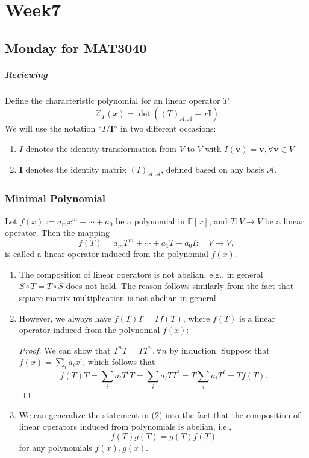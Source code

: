 \chapter{Week7}
\section{Monday for MAT3040}
\paragraph{Reviewing}
Define the characteristic polynomial for an linear operator $T$:
\[
\mathcal{X}_T(x)= \det((T)_{\mathcal{A},\mathcal{A}} - x\bm I)
\]
We will use the notation ``$I/\bm I$'' in two different occasions:
\begin{enumerate}
\item
$I$ denotes the identity transformation from $V$ to $V$ with $I(\bm v)=\bm v,\forall\bm v\in V$
\item
$\bm I$ denotes the identity matrix $(I)_{\mathcal{A},\mathcal{A}}$, defined based on any basis $\mathcal{A}$.
\end{enumerate}

\subsection{Minimal Polynomial}
\begin{definition}
Let $f(x):=a_mx^m+\cdots+a_0$ be a polynomial in $\mathbb{F}[x]$, and $T:V\to V$ be a linear operator.
Then the mapping
\[
f(T)=a_mT^m+\cdots+a_1T+a_0I:\quad
V\to V,
\]
is called a linear operator induced from the polynomial $f(x)$.
\end{definition}
\begin{remark}
\begin{enumerate}
\item
The composition of linear operators is not abelian, e.g., in general $S\circ T=T\circ S$ does not hold.
The reason follows similarly from the fact that square-matrix multiplication is not abelian in general.
\item
However, we always have $f(T)T=Tf(T)$, where $f(T)$ is a linear operator induced from the polynomial $f(x)$:
\begin{proof}
We can show that $T^nT=TT^n,\forall n$ by induction.
Suppose that $f(x)=\sum_ia_ix^i$, which follows that
\[
f(T)T=\sum_ia_iT^iT=\sum_ia_iTT^i=T\sum_ia_iT^i=Tf(T).
\]
\end{proof}
\item
We can generalize the statement in (2) into the fact that the composition of linear operators induced from polynomials is abelian, i.e., 
\[
f(T)g(T)=g(T)f(T)
\]
for any polynomials $f(x),g(x)$.
\end{enumerate}


\end{remark}






